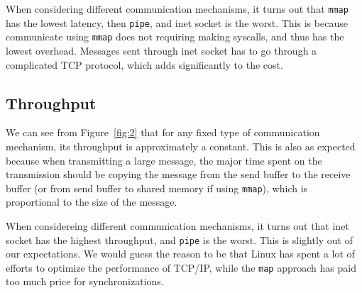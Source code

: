\documentclass[11pt,conference]{IEEEtran}
\begin{document}
When considering different communication mechanisms, it turns out that \texttt{mmap} has the lowest latency, then \texttt{pipe}, and inet socket is the worst.
This is because communicate using \texttt{mmap} does not requiring making syscalls, and thus has the lowest overhead.
Messages sent through inet socket has to go through a complicated TCP protocol, which adds significantly to the cost.

\subsection{Throughput}
We can see from Figure~\ref{fig:2} that for any fixed type of communication mechanism, its throughput is approximately a constant.
This is also as expected because when transmitting a large message, the major time spent on the transmission should be copying the message from the send buffer to the receive buffer (or from send buffer to shared memory if using \texttt{mmap}), which is proportional to the size of the message.

When considereing different communication mechanisms, it turns out that inet socket has the highest throughput, and \texttt{pipe} is the worst.
This is slightly out of our expectations.
We would guess the reason to be that Linux has spent a lot of efforts to optimize the performance of TCP/IP, while the \texttt{map} approach has paid too much price for synchronizations.


%
%
%








\end{document}
